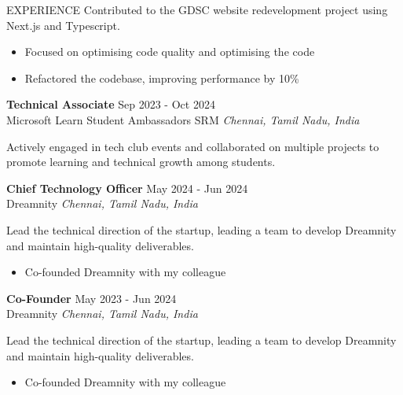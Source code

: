 \documentclass{resume}
\begin{document}
\begin{rSection}{EXPERIENCE}
Contributed to the GDSC website redevelopment project using Next.js and Typescript.

\begin{itemize}
\item Focused on optimising code quality and optimising the code
\item Refactored the codebase, improving performance by 10\%
\end{itemize}
\textbf{Technical Associate} \hfill Sep 2023 - Oct 2024\\
Microsoft Learn Student Ambassadors SRM \hfill \textit{Chennai, Tamil Nadu, India}

Actively engaged in tech club events and collaborated on multiple projects to promote learning and technical growth among students.

\textbf{Chief Technology Officer} \hfill May 2024 - Jun 2024\\
Dreamnity \hfill \textit{Chennai, Tamil Nadu, India}

Lead the technical direction of the startup, leading a team to develop Dreamnity and maintain high-quality deliverables.

\begin{itemize}
\item Co-founded Dreamnity with my colleague
\end{itemize}
\textbf{Co-Founder} \hfill May 2023 - Jun 2024\\
Dreamnity \hfill \textit{Chennai, Tamil Nadu, India}

Lead the technical direction of the startup, leading a team to develop Dreamnity and maintain high-quality deliverables.

\begin{itemize}
\item Co-founded Dreamnity with my colleague
\end{itemize}

\end{rSection}

\vspace{1.5em}

\end{document}
